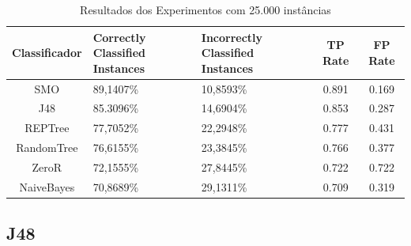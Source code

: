 \documentclass[
	12pt,				%
	openright,			%
	oneside,	
	a4paper,				%
	english,				%
	brazil				%
]{abntex2/abntex2} %
\begin{document}
\begin{table}[htbp]
	\centering
	\caption{Resultados dos Experimentos com 25.000 instâncias}
	\label{tabResultadosExperimentos25k}
	\begin{center}
		\renewcommand{\arraystretch}{2}
		\begin{tabular}{cp{3cm}p{3.2cm}cc}
			\hline
			\textbf{Classificador}                & \textbf{Correctly Classified Instances}               & \textbf{Incorrectly Classified Instances}      	& \textbf{TP Rate}						&\textbf{FP Rate}   \\ \hline
			SMO                                      & 89,1407\%                                                                                 & 10,8593\% 							&0.891									&0.169                                                                                    \\
			J48                                      & 85.3096\%                                                                                  & 14,6904\% 							&0.853										&0.287                                                                                     \\
			REPTree                                  & 77,7052\%                                                                                 & 22,2948\%								&0.777											&0.431                                                                                     \\ 
			RandomTree                               & 76,6155\%                                                                                 & 23,3845\%								&0.766												&0.377                                                                                     \\ \hline \hline
			ZeroR    									& 72,1555\%                                                 									& 27,8445\%								&0.722											&0.722                                                     								\\ 
			NaiveBayes                               & 70,8689\%                                                                                 &  29,1311\%									&0.709												&0.319                                                                                     \\ \hline
		\end{tabular}
	\end{center}
\end{table}

		\subsection{J48}
\end{document}
